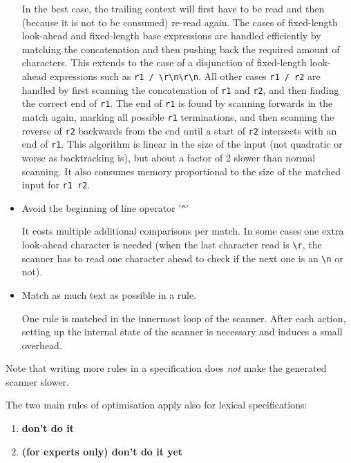 \begin{itemize}
  In the best case, the trailing context will first have to be read and
  then (because it is not to be consumed) re-read again. The cases of
  fixed-length look-ahead and fixed-length base expressions are handled
  efficiently by matching the concatenation and then pushing back the
  required amount of characters. This extends to the case of a
  disjunction of fixed-length look-ahead expressions such as
  \texttt{r1\ /\ \textbackslash{}r\textbar{}\textbackslash{}n\textbar{}\textbackslash{}r\textbackslash{}n}.
  All other cases \texttt{r1\ /\ r2} are handled by first scanning the
  concatenation of \texttt{r1} and \texttt{r2}, and then finding the
  correct end of \texttt{r1}. The end of \texttt{r1} is found by
  scanning forwards in the match again, marking all possible \texttt{r1}
  terminations, and then scanning the reverse of \texttt{r2} backwards
  from the end until a start of \texttt{r2} intersects with an end of
  \texttt{r1}. This algorithm is linear in the size of the input (not
  quadratic or worse as backtracking is), but about a factor of 2 slower
  than normal scanning. It also consumes memory proportional to the size
  of the matched input for \texttt{r1\ r2}.
\item
  Avoid the beginning of line operator '\texttt{\^{}}'

  It costs multiple additional comparisons per match. In some cases one
  extra look-ahead character is needed (when the last character read is
  \texttt{\textbackslash{}r}, the scanner has to read one character
  ahead to check if the next one is an \texttt{\textbackslash{}n} or
  not).
\item
  Match as much text as possible in a rule.

  One rule is matched in the innermost loop of the scanner. After each
  action, setting up the internal state of the scanner is necessary and
  induces a small overhead.
\end{itemize}

Note that writing more rules in a specification does \emph{not} make the
generated scanner slower.

The two main rules of optimisation apply also for lexical
specifications:

\begin{enumerate}
\def\labelenumi{\arabic{enumi}.}
\itemsep1pt\parskip0pt
\item
  \textbf{don't do it}
\item
  \textbf{(for experts only) don't do it yet}
\end{enumerate}

